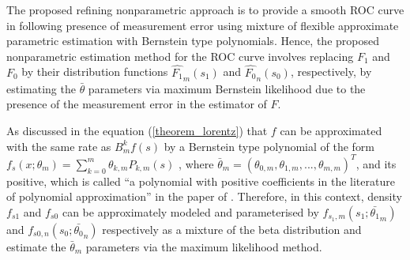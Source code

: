 The proposed refining nonparametric approach is to provide a smooth ROC curve in  following presence of measurement error using mixture of flexible approximate parametric estimation with Bernstein type polynomials. Hence, the proposed nonparametric estimation method for the ROC curve involves replacing $F_1$ and $F_0$ by their distribution functions $\hat{F_1}_{m}(s_1)$ and $\hat{F_0}_{n}(s_0)$, respectively, by estimating the $\bar{\theta}$ parameters via maximum Bernstein likelihood due to the presence of the measurement error in the estimator of $F$.

As \cite{lorentz2013bernstein} discussed in the equation (\ref{theorem_lorentz}) that $f$ can be approximated with the same rate as $B_m^kf(s)$ by a Bernstein type polynomial of the form $f_s(x;\theta_m) = \sum_{k=0}^{m}\theta_{k,m}P_{k,m}(s)$ , where $\bar{\theta}_m= (\theta_{0,m}, \theta_{1,m}, ..., \theta_{m,m})^T$, and its positive, which is called \enquote{a polynomial with positive coefficients in the literature of polynomial approximation} in the paper of \cite{guan2016efficient}. Therefore, in this context, density $f_{s1}$ and $f_{s0}$ can be approximately modeled and parameterised by $f_{s_1,m}(s_1; \bar{\theta_1}_m)$ and $f_{s0, n}(s_0; \bar{\theta_0}_n)$  respectively as a mixture of the beta distribution and estimate the $\bar{\theta}_m$ parameters via the maximum likelihood method.

